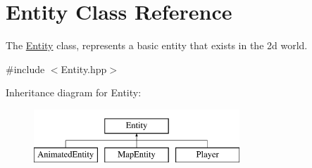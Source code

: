 \hypertarget{class_entity}{\section{Entity Class Reference}
\label{class_entity}
}


The \hyperlink{class_entity}{Entity} class, represents a basic entity that exists in the 2d world.  




{\ttfamily \#include $<$Entity.\-hpp$>$}

Inheritance diagram for Entity\-:\begin{figure}[H]
\begin{center}
\leavevmode
\includegraphics[height=2.000000cm]{class_entity}
\end{center}
\end{figure}
